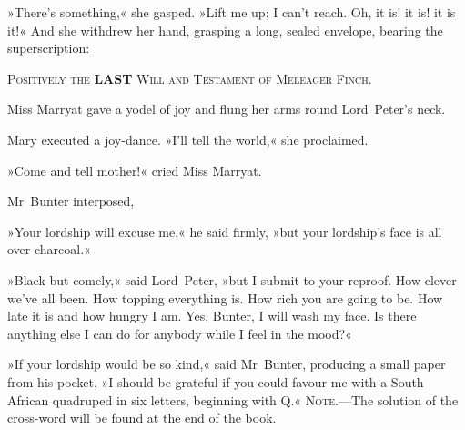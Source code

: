 »There's something,« she gasped. »Lift me up; I can't reach. Oh, it is! it is! it is it!« And she withdrew her hand, grasping a long, sealed envelope, bearing the superscription:

\begin{center}\scshape
Positively the \textbf{LAST} Will and Testament of Meleager Finch.
\end{center}

Miss Marryat gave a yodel of joy and flung her arms round Lord~Peter's neck.

Mary executed a joy-dance. »I'll tell the world,« she proclaimed.

»Come and tell mother!« cried Miss Marryat.

Mr~Bunter interposed,

»Your lordship will excuse me,« he said firmly, »but your lordship's face is all over charcoal.«

»Black but comely,« said Lord~Peter, »but I submit to your reproof. How clever we've all been. How topping everything is. How rich you are going to be. How late it is and how hungry I am. Yes, Bunter, I will wash my face. Is there anything else I can do for anybody while I feel in the mood?«

»If your lordship would be so kind,« said Mr~Bunter, producing a small paper from his pocket, »I should be grateful if you could favour me with a South African quadruped in six letters, beginning with Q.«
\vfill
\textsc{Note}.—The solution of the cross-word will be found at the end of the book.